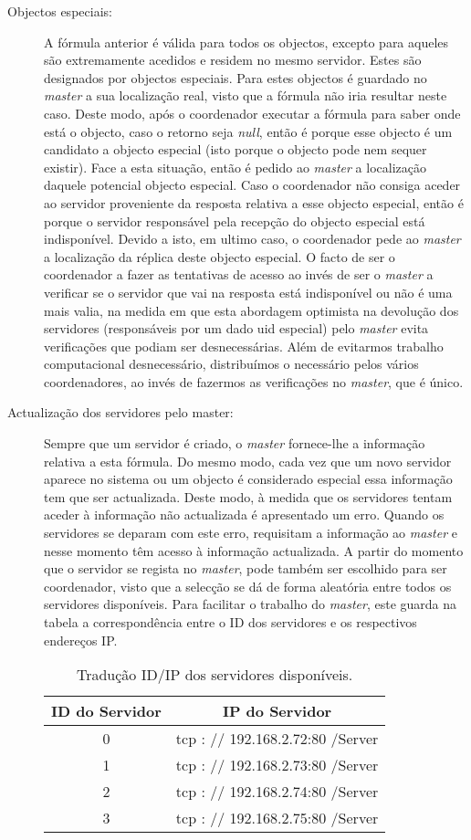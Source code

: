 \begin{description}
\item[Objectos especiais:] 
A fórmula anterior é válida para todos os objectos, excepto para aqueles são extremamente acedidos e residem no mesmo servidor. Estes são designados por objectos especiais. Para estes objectos é guardado no \textit{master} a sua localização real, visto que a fórmula não iria resultar neste caso. 
Deste modo, após o coordenador executar a fórmula para saber onde está o objecto, caso o retorno seja \textit{null}, então é porque esse objecto é um candidato a objecto especial (isto porque o objecto pode nem sequer existir). Face a esta situação, então é pedido ao \textit{master} a localização daquele potencial objecto especial. Caso o coordenador não consiga aceder ao servidor proveniente da resposta relativa a esse objecto especial, então é porque o servidor responsável pela recepção do objecto especial está indisponível. Devido a isto, em ultimo caso, o coordenador pede ao \textit{master} a localização da réplica deste objecto especial. O facto de ser o coordenador a fazer as tentativas de acesso ao invés de ser o \textit{master} a verificar se o servidor que vai na resposta está indisponível ou não é uma mais valia, na medida em que esta abordagem optimista na devolução dos servidores (responsáveis por um dado uid especial) pelo \textit{master} evita verificações que podiam ser desnecessárias. Além de evitarmos trabalho computacional desnecessário, distribuímos o necessário pelos vários coordenadores, ao invés de fazermos as verificações no \textit{master}, que é único.

\item[Actualização dos servidores pelo master:] 
Sempre que um servidor é criado, o \textit{master} fornece-lhe a informação relativa a esta fórmula. Do mesmo modo, cada vez que um novo servidor aparece no sistema ou um objecto é considerado especial essa informação tem que ser actualizada. Deste modo, à medida que os servidores tentam aceder à informação não actualizada é apresentado um erro. Quando os servidores se deparam com este erro, requisitam a informação ao \textit{master} e nesse momento têm acesso à informação actualizada. A partir do momento que o servidor se regista no \textit{master}, pode também ser escolhido para ser coordenador, visto que a selecção se dá de forma aleatória entre todos os servidores disponíveis. Para facilitar o trabalho do \textit{master}, este guarda na tabela a correspondência entre o ID dos servidores e os respectivos endereços IP. 

\begin{table}[htb]
\centering
\begin{tabular}{c|c}
ID do Servidor & IP do Servidor \\\hline
0 & tcp : // 192.168.2.72:80 /Server \\
1 & tcp : // 192.168.2.73:80 /Server \\
2 & tcp : // 192.168.2.74:80 /Server \\
3 & tcp : // 192.168.2.75:80 /Server \\
\end{tabular}
\caption{\label{tab:idip}Tradução ID/IP dos servidores disponíveis.}
\end{table}


\end{description}
